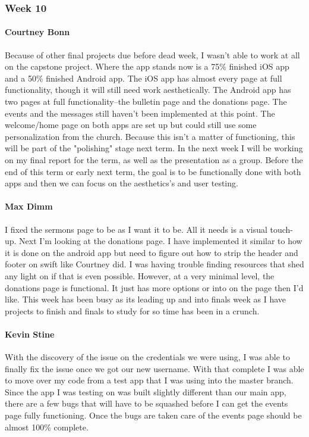 		\subsubsection{Week 10}

			\paragraph{Courtney Bonn}
			Because of other final projects due before dead week, I wasn't able to work at all on the capstone project. Where the app stands now is a 75\% finished iOS app and a 50\% finished Android app. The iOS app has almost every page at full functionality, though it will still need work aesthetically. The Android app has two pages at full functionality--the bulletin page and the donations page. The events and the messages still haven't been implemented at this point. The welcome/home page on both apps are set up but could still use some personalization from the church. Because this isn't a matter of functioning, this will be part of the "polishing" stage next term. In the next week I will be working on my final report for the term, as well as the presentation as a group. Before the end of this term or early next term, the goal is to be functionally done with both apps and then we can focus on the aesthetics's and user testing.

			\paragraph{Max Dimm}
			I fixed the sermons page to be as I want it to be. All it needs is a visual touch-up. Next I'm looking at the donations page. I have implemented it similar to how it is done on the android app but need to figure out how to strip the header and footer on swift like Courtney did. I was having trouble finding resources that shed any light on if that is even possible. However, at a very minimal level, the donations page is functional. It just has more options or into on the page then I'd like. This week has been busy as its leading up and into finals week as I have projects to finish and finals to study for so time has been in a crunch.

			\paragraph{Kevin Stine}
			With the discovery of the issue on the credentials we were using, I was able to finally fix the issue once we got our new username. With that complete I was able to move over my code from a test app that I was using into the master branch. Since the app I was testing on was built slightly different than our main app, there are a few bugs that will have to be squashed before I can get the events page fully functioning. Once the bugs are taken care of the events page should be almost 100\% complete.

